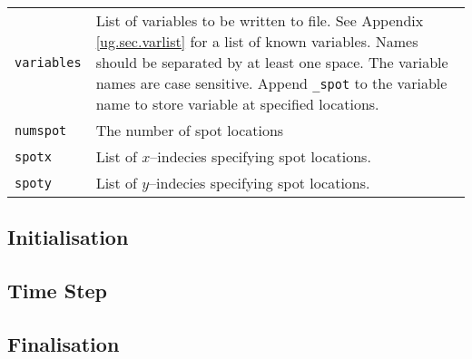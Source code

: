 \begin{center}
\begin{supertabular}{|l|p{11cm}|}
   \texttt{variables} & List of variables to be written to file. See Appendix \ref{ug.sec.varlist} for a list of known variables. Names should be separated by at least one space. The variable names are case sensitive. Append \texttt{\_spot} to the variable name to store variable at specified locations.\\
   \texttt{numspot} & The number of spot locations\\
   \texttt{spotx} & List of $x$--indecies specifying spot locations.\\
   \texttt{spoty} & List of $y$--indecies specifying spot locations.\\   
  \hline
  \end{supertabular}
\end{center}

\subsection{Initialisation}

\subsection{Time Step}

\subsection{Finalisation}